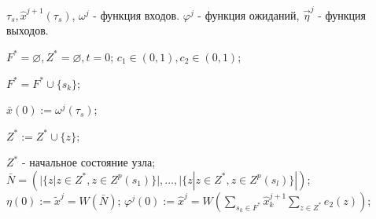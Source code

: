 		\Require $\tau_s, \hat x^{j+1}(\tau_s)$, $\omega^j$ - функция входов.
		\Ensure $\varphi^j$ - функция ожиданий, $\vec\eta^j$ - функция выходов.

		\State $F^*=\varnothing,Z^*=\varnothing,t=0$; 
		\State $c_1\in(0,1), c_2\in(0,1)$;

		\Statex {}
				
		 \label{alst:init_start}
			 \label{alst:select_f}
				\State $F^*=F^*\cup\{s_k\}$;
			\EndIf
		\EndFor
		
		\State $\bar x(0):=\omega^j(\tau_s)$;
		
				 \label{alst:select_z}
					\State $Z^*:=Z^*\cup\{z\}$;
				\EndIf
			\EndFor
		\EndFor
		
		\State $Z^*$ - начальное состояние узла; \label{alst:init_state}
		\State $\bar N=(|\{z|z\in Z^*,z\in Z^p(s_1)\}|,\dots,|\{z|z\in Z^*,z\in Z^p(s_l)\}|)$; \label{alst:init_calc_out2}
		\State $\eta(0):=\tilde x^j=W(\bar N)$; \label{alst:init_calc_out3}
		\State $\varphi^j(0):=\hat x^j=W(\sum_{s_k\in F^*}\hat x_k^{j+1}\sum_{z\in Z^*}e_2(z))$;\label{alst:init_control}
		\label{alst:init_end}